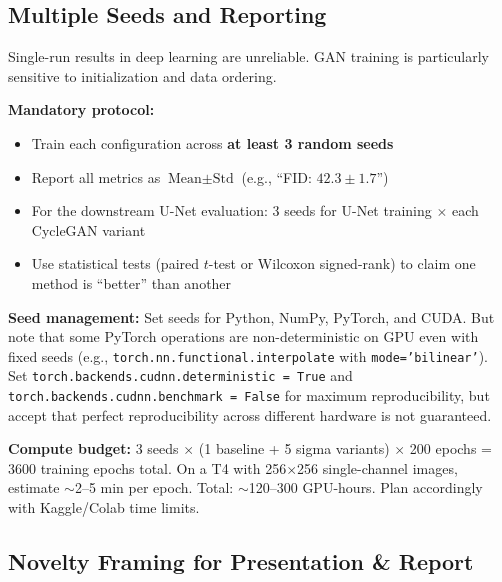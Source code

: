 \documentclass[11pt,a4paper]{article}
\theoremstyle{definition}
\begin{document}
\subsection{Multiple Seeds and Reporting}

Single-run results in deep learning are unreliable. GAN training is particularly sensitive to initialization and data ordering.

\textbf{Mandatory protocol:}
\begin{itemize}
    \item Train each configuration across \textbf{at least 3 random seeds}
    \item Report all metrics as $\text{Mean} \pm \text{Std}$ (e.g., ``FID: $42.3 \pm 1.7$'')
    \item For the downstream U-Net evaluation: 3 seeds for U-Net training $\times$ each CycleGAN variant
    \item Use statistical tests (paired $t$-test or Wilcoxon signed-rank) to claim one method is ``better'' than another
\end{itemize}

\begin{edgecase}
\textbf{Seed management:} Set seeds for Python, NumPy, PyTorch, and CUDA. But note that some PyTorch operations are non-deterministic on GPU even with fixed seeds (e.g., \texttt{torch.nn.functional.interpolate} with \texttt{mode='bilinear'}). Set \texttt{torch.backends.cudnn.deterministic = True} and \texttt{torch.backends.cudnn.benchmark = False} for maximum reproducibility, but accept that perfect reproducibility across different hardware is not guaranteed.

\vspace{0.3em}
\textbf{Compute budget:} 3 seeds $\times$ (1 baseline + 5 sigma variants) $\times$ 200 epochs = 3600 training epochs total. On a T4 with 256$\times$256 single-channel images, estimate $\sim$2--5 min per epoch. Total: $\sim$120--300 GPU-hours. Plan accordingly with Kaggle/Colab time limits.
\end{edgecase}

\subsection{Novelty Framing for Presentation \& Report}
\end{document}
